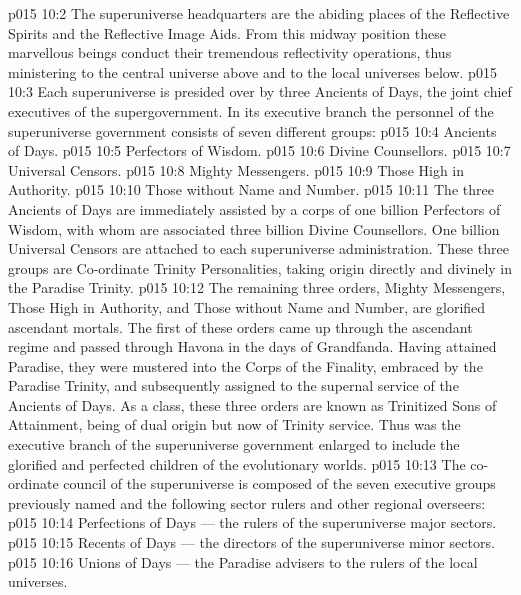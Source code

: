 \vs p015 10:2 The superuniverse headquarters are the abiding places of the Reflective Spirits and the Reflective Image Aids. From this midway position these marvellous beings conduct their tremendous reflectivity operations, thus ministering to the central universe above and to the local universes below.
\vs p015 10:3 \pc Each superuniverse is presided over by three Ancients of Days, the joint chief executives of the supergovernment. In its executive branch the personnel of the superuniverse government consists of seven different groups:
\vs p015 10:4 \bibnobreakspace Ancients of Days.
\vs p015 10:5 \bibnobreakspace Perfectors of Wisdom.
\vs p015 10:6 \bibnobreakspace Divine Counsellors.
\vs p015 10:7 \bibnobreakspace Universal Censors.
\vs p015 10:8 \bibnobreakspace Mighty Messengers.
\vs p015 10:9 \bibnobreakspace Those High in Authority.
\vs p015 10:10 \bibnobreakspace Those without Name and Number.
\vs p015 10:11 \pc The three Ancients of Days are immediately assisted by a corps of one billion Perfectors of Wisdom, with whom are associated three billion Divine Counsellors. One billion Universal Censors are attached to each superuniverse administration. These three groups are Co\hyp{}ordinate Trinity Personalities, taking origin directly and divinely in the Paradise Trinity.
\vs p015 10:12 The remaining three orders, Mighty Messengers, Those High in Authority, and Those without Name and Number, are glorified ascendant mortals. The first of these orders came up through the ascendant regime and passed through Havona in the days of Grandfanda. Having attained Paradise, they were mustered into the Corps of the Finality, embraced by the Paradise Trinity, and subsequently assigned to the supernal service of the Ancients of Days. As a class, these three orders are known as Trinitized Sons of Attainment, being of dual origin but now of Trinity service. Thus was the executive branch of the superuniverse government enlarged to include the glorified and perfected children of the evolutionary worlds.
\vs p015 10:13 The co\hyp{}ordinate council of the superuniverse is composed of the seven executive groups previously named and the following sector rulers and other regional overseers:
\vs p015 10:14 \bibnobreakspace Perfections of Days --- the rulers of the superuniverse major sectors.
\vs p015 10:15 \bibnobreakspace Recents of Days --- the directors of the superuniverse minor sectors.
\vs p015 10:16 \bibnobreakspace Unions of Days --- the Paradise advisers to the rulers of the local universes.
